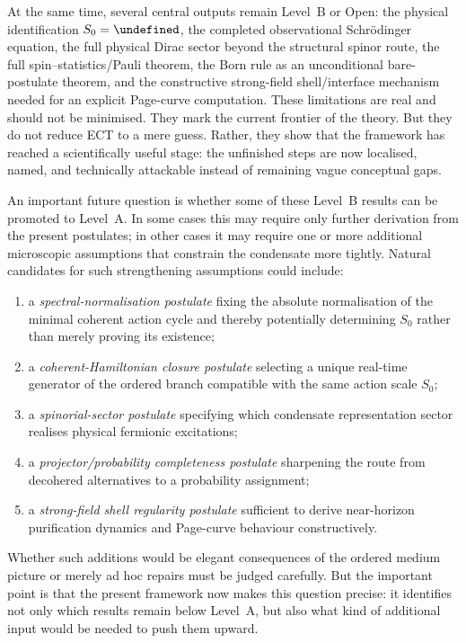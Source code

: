 \documentclass[11pt,a4paper]{article}
\let\hbar\undefined
\numberwithin{equation}{section}
\begin{document}
At the same time, several central outputs remain Level~B or Open:
the physical identification $S_0=\hbar$,
the completed observational Schr\"odinger equation,
the full physical Dirac sector beyond the structural spinor route,
the full spin--statistics/Pauli theorem,
the Born rule as an unconditional bare-postulate theorem,
and the constructive strong-field shell/interface mechanism needed for
an explicit Page-curve computation.
These limitations are real and should not be minimised.
They mark the current frontier of the theory.
But they do not reduce ECT to a mere guess.
Rather, they show that the framework has reached a scientifically
useful stage: the unfinished steps are now localised, named, and
technically attackable instead of remaining vague conceptual gaps.

An important future question is whether some of these Level~B results
can be promoted to Level~A.
In some cases this may require only further derivation from the present
postulates; in other cases it may require one or more additional
microscopic assumptions that constrain the condensate more tightly.
Natural candidates for such strengthening assumptions could include:
\begin{enumerate}[label=(\roman*),noitemsep]
\item a \emph{spectral-normalisation postulate} fixing the absolute
normalisation of the minimal coherent action cycle and thereby
potentially determining $S_0$ rather than merely proving its existence;
\item a \emph{coherent-Hamiltonian closure postulate} selecting a unique
real-time generator of the ordered branch compatible with the same
action scale $S_0$;
\item a \emph{spinorial-sector postulate} specifying which condensate
representation sector realises physical fermionic excitations;
\item a \emph{projector/probability completeness postulate} sharpening
the route from decohered alternatives to a probability assignment;
\item a \emph{strong-field shell regularity postulate} sufficient to
derive near-horizon purification dynamics and Page-curve behaviour
constructively.
\end{enumerate}
Whether such additions would be elegant consequences of the ordered
medium picture or merely ad hoc repairs must be judged carefully.
But the important point is that the present framework now makes this
question precise:
it identifies not only which results remain below Level~A, but also
what kind of additional input would be needed to push them upward.
\end{document}
